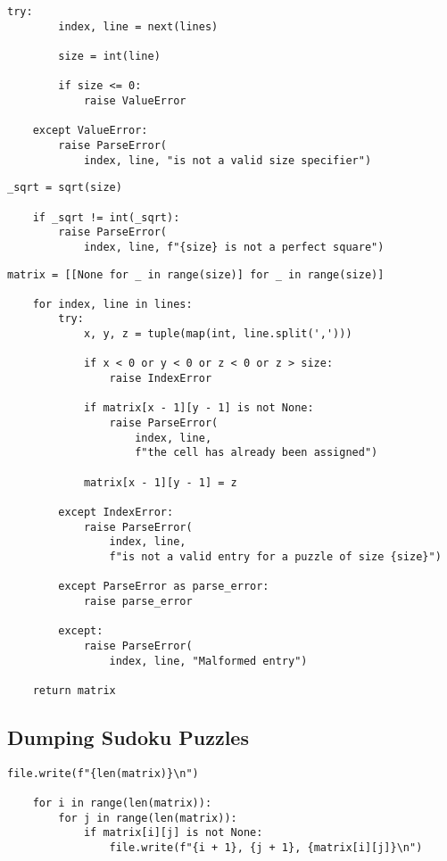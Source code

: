 \documentclass[12pt]{article}
\begin{document}
\begin{lstlisting}[caption={Determining the size of the matrix}]
    try:
        index, line = next(lines)

        size = int(line)

        if size <= 0:
            raise ValueError

    except ValueError:
        raise ParseError(
            index, line, "is not a valid size specifier")
\end{lstlisting}

\begin{lstlisting}[caption={Performing some sanity checks corresponding to the size of the matrix}]
    _sqrt = sqrt(size)

    if _sqrt != int(_sqrt):
        raise ParseError(
            index, line, f"{size} is not a perfect square")
\end{lstlisting}

\pagebreak

\begin{lstlisting}[caption={Creating and populating a two-dimensional matrix while performing some sanity checks corresponding to each matrix entry}]
    matrix = [[None for _ in range(size)] for _ in range(size)]

    for index, line in lines:
        try:
            x, y, z = tuple(map(int, line.split(',')))

            if x < 0 or y < 0 or z < 0 or z > size:
                raise IndexError

            if matrix[x - 1][y - 1] is not None:
                raise ParseError(
                    index, line,
                    f"the cell has already been assigned")

            matrix[x - 1][y - 1] = z

        except IndexError:
            raise ParseError(
                index, line,
                f"is not a valid entry for a puzzle of size {size}")

        except ParseError as parse_error:
            raise parse_error

        except:
            raise ParseError(
                index, line, "Malformed entry")

    return matrix
\end{lstlisting}

\pagebreak

\subsection{Dumping Sudoku Puzzles}

\begin{lstlisting}[caption={Dumping a two-dimensional matrix corresponding to a Sudoku Puzzle to a file}]
    file.write(f"{len(matrix)}\n")

    for i in range(len(matrix)):
        for j in range(len(matrix)):
            if matrix[i][j] is not None:
                file.write(f"{i + 1}, {j + 1}, {matrix[i][j]}\n")
\end{lstlisting}
\end{document}
